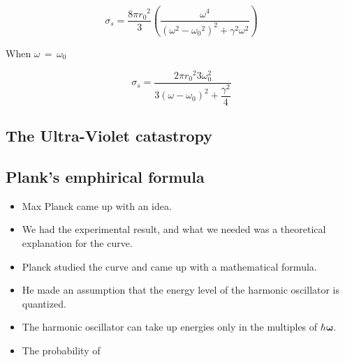 \documentclass[aspectratio=169]{beamer}
\begin{document}
\begin{frame}
	
	{\large \[ \sigma_s = \frac{8\pi {r_0}^{2}}{3} \left( \frac{\omega^{4}}{(\omega^2-{\omega_0}^{2})^2+\gamma^2 \omega^2}\right) \]}\newline
		\begin{center}
			When $ \omega\,=\,\omega_0 $ \newline 
		\end{center}		
	{\large \[ \sigma_s = \frac{2\pi {r_0}^{2}{3} \omega_0^{2}}{3(\omega-\omega_0)^2+\dfrac{\gamma^2}{4}} \]}
	
\end{frame}
				
\subsection{The Ultra-Violet catastropy} 

\subsection{Plank's emphirical formula}
\begin{frame}{}
	\begin{itemize}

		\item Max Planck came up with an idea. \newline
		\item We had the experimental result, and what we needed was a theoretical explanation for the curve. \newline
		\item Planck studied the curve and came up with a mathematical formula. \newline
	\end{itemize}
\end{frame}
\begin{frame}{}
	\begin{itemize}

		\item He made an assumption that the energy level of the harmonic oscillator is quantized.  \newline
		\item The harmonic oscillator can take up energies only in the multiples of $ \mathbf{\hbar \omega} $.  \newline
		\item The probability of 
	\end{itemize}
\end{frame}
\end{document}
